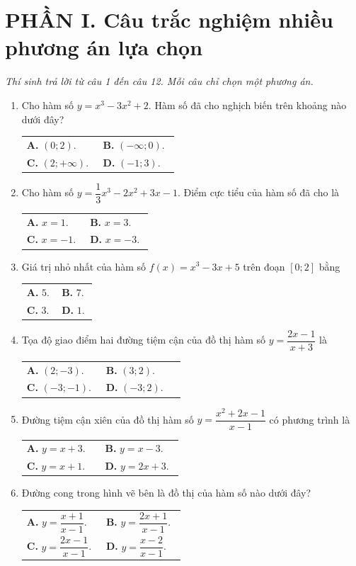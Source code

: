 \documentclass[12pt,a4paper]{article}
\makeatletter
\newcommand{\bonpa}[4]{\par\nobreak\smallskip\nobreak\noindent
\begin{tabular}{@{}p{0.47\linewidth}p{0.47\linewidth}@{}}
\textbf{A.} #1 & \textbf{B.} #2\\[8pt]
\textbf{C.} #3 & \textbf{D.} #4\end{tabular}}
\makeatother
\begin{document}
\section*{\large PHẦN I. Câu trắc nghiệm nhiều phương án lựa chọn}
\textit{Thí sinh trả lời từ câu 1 đến câu 12. Mỗi câu chỉ chọn một phương án.}
\begin{enumerate}
\item Cho hàm số $y=x^3-3x^2+2$. Hàm số đã cho nghịch biến trên khoảng nào dưới đây?
\bonpa{$(0;2)$.}{$(-\infty;0)$.}{$(2;+\infty)$.}{$(-1;3)$.}

\item Cho hàm số $y=\dfrac{1}{3}x^3-2x^2+3x-1$. Điểm cực tiểu của hàm số đã cho là
\bonpa{$x=1$.}{$x=3$.}{$x=-1$.}{$x=-3$.}

\item Giá trị nhỏ nhất của hàm số $f(x)=x^3-3x+5$ trên đoạn $[0;2]$ bằng
\bonpa{$5$.}{$7$.}{$3$.}{$1$.}

\item Tọa độ giao điểm hai đường tiệm cận của đồ thị hàm số $y=\dfrac{2x-1}{x+3}$ là
\bonpa{$(2;-3)$.}{$(3;2)$.}{$(-3;-1)$.}{$(-3;2)$.}

\item Đường tiệm cận xiên của đồ thị hàm số $y=\dfrac{x^2+2x-1}{x-1}$ có phương trình là
\bonpa{$y=x+3$.}{$y=x-3$.}{$y=x+1$.}{$y=2x+3$.}

\item Đường cong trong hình vẽ bên là đồ thị của hàm số nào dưới đây?
\par\nobreak\smallskip
\begin{minipage}[c]{0.62\linewidth}
\bonpa{$y=\dfrac{x+1}{x-1}$.}{$y=\dfrac{2x+1}{x-1}$.}{$y=\dfrac{2x-1}{x-1}$.}{$y=\dfrac{x-2}{x-1}$.}
\end{minipage}\hfill
\begin{minipage}[c]{0.36\linewidth}\centering
{}
\end{minipage}
\end{enumerate}
\end{document}
